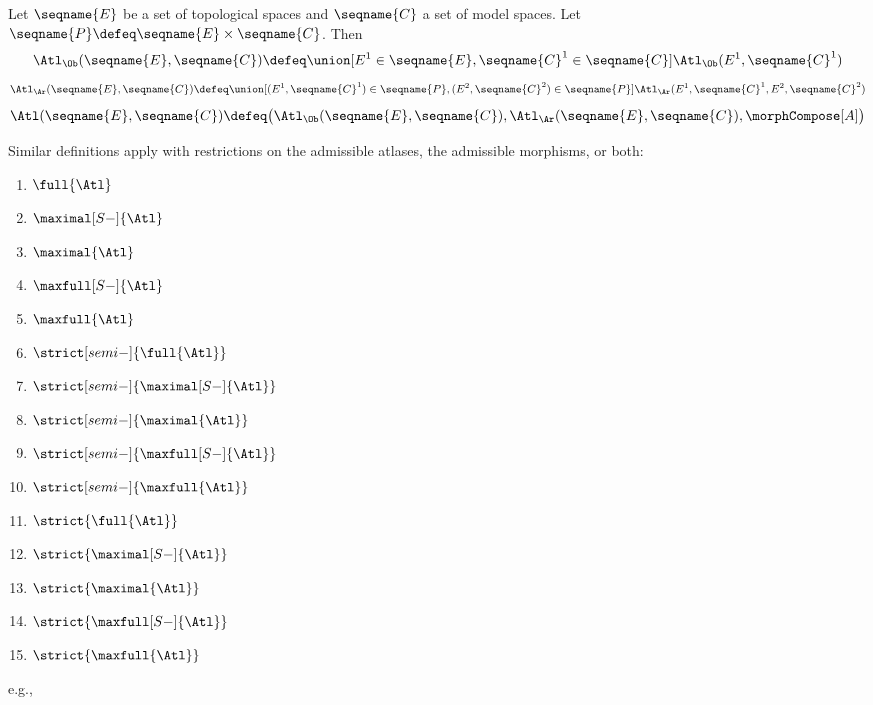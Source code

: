 \documentclass{article}
\begin{document}
\begin{definition}
\label{def:T-cat}
Let $\seqname{E}$ be a set of topological spaces and $\seqname{C}$ a
set of model spaces.
Let $\seqname{P} \defeq \seqname{E} \times \seqname{C}$.
Then
\begin{equation}
  \Atl_\Ob(\seqname{E}, \seqname{C})
  \defeq
  \union
    [
        {E^1 \in \seqname{E}},
        {\seqname{C}^1 \in \seqname{C}}
    ]
    {{
      \Atl_\Ob(E^1, \seqname{C}^1)
    }}
\end{equation}
\begin{equation}
  \Atl_\Ar(\seqname{E}, \seqname{C})
  \defeq
  \union
    [
        {(E^1, \seqname{C}^1) \in \seqname{P}},
        {(E^2, \seqname{C}^2) \in \seqname{P}}
    ]
    {{
      \Atl_{\Ar}
      (
        E^1,
        \seqname{C}^1,
        E^2,
        \seqname{C}^2
      )
    }}
\end{equation}
\begin{equation}
  \Atl(\seqname{E}, \seqname{C})
  \defeq
  \bigl (
    \Atl_\Ob(\seqname{E}, \seqname{C}),
    \Atl_\Ar(\seqname{E}, \seqname{C}),
    \morphCompose[A]
  \bigr )
\end{equation}

Similar definitions apply with restrictions on the admissible atlases,
the admissible morphisms, or both:
\begin{enumerate}
\item $\full{\Atl}$
\item $\maximal[S-]{\Atl}$
\item $\maximal{\Atl}$
\item $\maxfull[S-]{\Atl}$
\item $\maxfull{\Atl}$
\item $\strict[semi-]{\full{\Atl}}$
\item $\strict[semi-]{\maximal[S-]{\Atl}}$
\item $\strict[semi-]{\maximal{\Atl}}$
\item $\strict[semi-]{\maxfull[S-]{\Atl}}$
\item $\strict[semi-]{\maxfull{\Atl}}$
\item $\strict{\full{\Atl}}$
\item $\strict{\maximal[S-]{\Atl}}$
\item $\strict{\maximal{\Atl}}$
\item $\strict{\maxfull[S-]{\Atl}}$
\item $\strict{\maxfull{\Atl}}$
\end{enumerate}
e.g.,


\end{definition}
\end{document}
